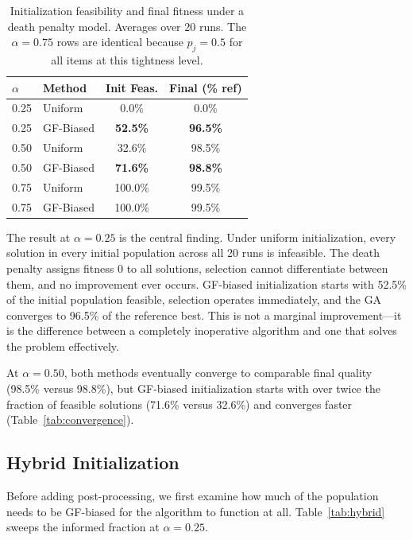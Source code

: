 \documentclass[twocolumn]{article}
\begin{document}
\begin{table}[H]
\centering
\begin{tabular}{llcc}
\toprule
$\alpha$ & Method & Init Feas. & Final (\% ref) \\
\midrule
0.25 & Uniform  & 0.0\%  & 0.0\%  \\
0.25 & GF-Biased & \textbf{52.5\%} & \textbf{96.5\%} \\
\midrule
0.50 & Uniform  & 32.6\% & 98.5\% \\
0.50 & GF-Biased & \textbf{71.6\%} & \textbf{98.8\%} \\
\midrule
0.75 & Uniform  & 100.0\% & 99.5\% \\
0.75 & GF-Biased & 100.0\% & 99.5\% \\
\bottomrule
\end{tabular}
\caption{Initialization feasibility and final fitness under a death 
penalty model. Averages over 20 runs. The $\alpha = 0.75$ rows are 
identical because $p_j = 0.5$ for all items at this tightness level.}
\label{tab:main}
\end{table}

The result at $\alpha = 0.25$ is the central finding. Under uniform 
initialization, every solution in every initial population across all 
20 runs is infeasible. The death penalty assigns fitness 0 to all 
solutions, selection cannot differentiate between them, and no 
improvement ever occurs. GF-biased initialization starts with 52.5\% 
of the initial population feasible, selection operates immediately, 
and the GA converges to 96.5\% of the reference best. This is not a 
marginal improvement---it is the difference between a completely 
inoperative algorithm and one that solves the problem effectively.

At $\alpha = 0.50$, both methods eventually converge to comparable 
final quality (98.5\% versus 98.8\%), but GF-biased initialization 
starts with over twice the fraction of feasible solutions (71.6\% 
versus 32.6\%) and converges faster (Table~\ref{tab:convergence}).

\subsection{Hybrid Initialization}
\label{sec:hybrid}

Before adding post-processing, we first examine how much of the 
population needs to be GF-biased for the algorithm to function at all. 
Table~\ref{tab:hybrid} sweeps the informed fraction at $\alpha = 0.25$.
\end{document}
